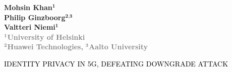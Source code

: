 \documentclass[portrait,a0]{a0poster}
\begin{document}
\begin{multicols}{2} 
\begin{minipage}[t]{1.5\linewidth}
\vspace{10pt}
\begin{flushleft}
\begin{spacing}{5}

\end{spacing}
\end{flushleft}
\end{minipage}

\begin{minipage}[t]{.95\linewidth} %
\vspace{-110pt} %
\begin{flushright}
\textsf{\bfseries
Mohsin Khan$^\textbf{1}$ 
\\
Philip Ginzboorg$^\textbf{2,3}$\\
Valtteri Niemi$^\textbf{1}$\\
} %
\textcolor{gray}{\textsf{\bfseries{$^\textbf{1}$University of Helsinki}}}\\
\textcolor{gray}{\textsf{\bfseries{$^\textbf{2}$Huawei Technologies,}}}
\textcolor{gray}{\textsf{\bfseries{$^\textbf{3}$Aalto University}}}\\
\end{flushright}
\end{minipage}
\end{multicols}


\vspace{10pt}

\begin{center}
 {\Huge{}\textcolor{black}{\MakeUppercase{Identity Privacy in 5G, Defeating Downgrade Attack}} \MakeUppercase{}}
\end{center}

\vspace{0pt}
\noindent\makebox[\linewidth]{\rule{\paperwidth}{5pt}}
\end{document}
